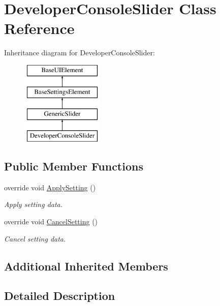 \hypertarget{class_developer_console_slider}{}\section{Developer\+Console\+Slider Class Reference}
\label{class_developer_console_slider}
Inheritance diagram for Developer\+Console\+Slider\+:\begin{figure}[H]
\begin{center}
\leavevmode
\includegraphics[height=4.000000cm]{class_developer_console_slider}
\end{center}
\end{figure}
\subsection*{Public Member Functions}
\begin{DoxyCompactItemize}
\item 
override void \hyperlink{class_developer_console_slider_a4ccde136331b3d8afb4172ad107f31f5}{Apply\+Setting} ()
\begin{DoxyCompactList}\small\item\em Apply setting data. \end{DoxyCompactList}\item 
override void \hyperlink{class_developer_console_slider_a2b3cb3192d1a3fd1d61e3ae7a1db0b29}{Cancel\+Setting} ()
\begin{DoxyCompactList}\small\item\em Cancel setting data. \end{DoxyCompactList}\end{DoxyCompactItemize}
\subsection*{Additional Inherited Members}


\subsection{Detailed Description}


